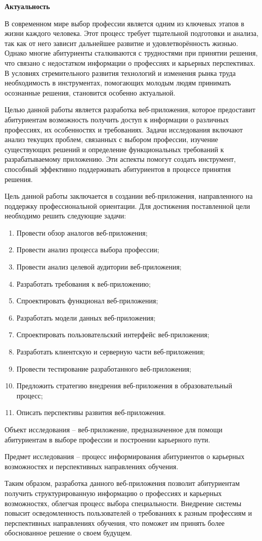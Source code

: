 \textbf{Актуальность}

В современном мире выбор профессии является одним из ключевых этапов в жизни каждого человека. Этот 
процесс требует тщательной подготовки и анализа, так как от него зависит дальнейшее развитие и 
удовлетворённость жизнью. Однако многие абитуриенты сталкиваются с трудностями при принятии решения, 
что связано с недостатком информации о профессиях и карьерных перспективах. В условиях стремительного 
развития технологий и изменения рынка труда необходимость в инструментах, помогающих молодым людям принимать 
осознанные решения, становится особенно актуальной.

Целью данной работы является разработка веб-приложения, которое предоставит абитуриентам возможность 
получить доступ к информации о различных профессиях, их особенностях и требованиях. Задачи исследования 
включают анализ текущих проблем, связанных с выбором профессии, изучение существующих решений и определение 
функциональных требований к разрабатываемому приложению. Эти аспекты помогут создать инструмент, способный 
эффективно поддерживать абитуриентов в процессе принятия решения.

Цель данной работы заключается в создании веб-приложения, направленного на поддержку профессиональной 
ориентации. Для достижения поставленной цели необходимо решить следующие задачи:
\begin{enumerate}
\item Провести обзор аналогов веб-приложения;
\item Провести анализ процесса выбора профессии;
\item Провести анализ целевой аудитории веб-приложения;
\item Разработать требования к веб-приложению;
\item Спроектировать функционал веб-приложения;
\item Разработать модели данных веб-приложения;
\item Спроектировать пользовательский интерфейс веб-приложения;
\item Разработать клиентскую и серверную части веб-приложения;
\item Провести тестирование разработанного веб-приложения;
\item Предложить стратегию внедрения веб-приложения в образовательный процесс;
\item Описать перспективы развития веб-приложения.
\end{enumerate}

Объект исследования – веб-приложение, предназначенное для помощи абитуриентам в выборе профессии и построении 
карьерного пути.

Предмет исследования – процесс информирования абитуриентов о карьерных возможностях и перспективных направлениях 
обучения.

Таким образом, разработка данного веб-приложения позволит абитуриентам получить структурированную информацию о 
профессиях и карьерных возможностях, облегчая процесс выбора специальности. Внедрение системы повысит 
осведомленность пользователей о требованиях к разным профессиям и перспективных направлениях обучения, что 
поможет им принять более обоснованное решение о своем будущем.
